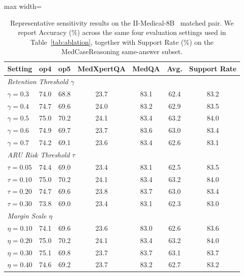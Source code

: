 \documentclass[a4paper,fleqn,doubleblind]{cas-sc}
\begin{document}
\begin{table}[htbp]
    \centering
    \footnotesize
    \setlength{\tabcolsep}{4.2pt}
    \caption[Representative sensitivity results on the matched pair.]{Representative sensitivity results on the II-Medical-8B~\cite{intelligentinternet2025iimedical8b} matched pair. We report Accuracy (\%) across the same four evaluation settings used in Table~\ref{tab:ablation}, together with Support Rate (\%) on the MedCaseReasoning same-answer subset.}
    \label{tab:sensitivity}
    \begin{adjustbox}{max width=\textwidth}
    \begin{tabular}{lcccccc}
        \toprule
        \textbf{Setting} & \textbf{op4} & \textbf{op5} & \textbf{MedXpertQA} & \textbf{MedQA} & \textbf{Avg.} & \textbf{Support Rate} \\
        \midrule
        \multicolumn{7}{l}{\textit{Retention Threshold $\gamma$}} \\
        \quad $\gamma=0.3$ & 74.0 & 68.8 & 23.7 & 83.1 & 62.4 & 83.2 \\
        \quad $\gamma=0.4$ & 74.7 & 69.6 & 24.0 & 83.2 & 62.9 & 83.5 \\
        \quad $\gamma=0.5$ & 75.0 & 70.2 & 24.1 & 83.4 & 63.2 & 84.0 \\
        \quad $\gamma=0.6$ & 74.9 & 69.7 & 23.7 & 83.6 & 63.0 & 83.4 \\
        \quad $\gamma=0.7$ & 74.2 & 69.1 & 23.6 & 83.4 & 62.6 & 83.1 \\
        \midrule
        \multicolumn{7}{l}{\textit{ARU Risk Threshold $\tau$}} \\
        \quad $\tau=0.05$ & 74.4 & 69.0 & 23.4 & 83.1 & 62.5 & 83.5 \\
        \quad $\tau=0.10$ & 75.0 & 70.2 & 24.1 & 83.4 & 63.2 & 84.0 \\
        \quad $\tau=0.20$ & 74.7 & 69.6 & 23.8 & 83.7 & 63.0 & 83.4 \\
        \quad $\tau=0.30$ & 73.8 & 69.0 & 23.4 & 83.1 & 62.3 & 83.0 \\
        \midrule
        \multicolumn{7}{l}{\textit{Margin Scale $\eta$}} \\
        \quad $\eta=0.10$ & 74.1 & 69.6 & 23.6 & 83.0 & 62.6 & 83.6 \\
        \quad $\eta=0.20$ & 75.0 & 70.2 & 24.1 & 83.4 & 63.2 & 84.0 \\
        \quad $\eta=0.30$ & 75.1 & 69.8 & 23.7 & 83.7 & 63.1 & 83.7 \\
        \quad $\eta=0.40$ & 74.6 & 69.2 & 23.7 & 83.2 & 62.7 & 83.2 \\
        \bottomrule
    \end{tabular}
    \end{adjustbox}
\end{table}
\end{document}
